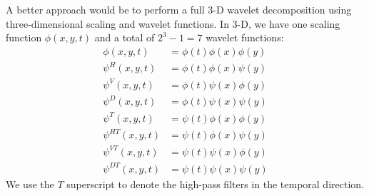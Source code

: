 A better approach would be to perform a full 3-D wavelet decomposition using three-dimensional scaling and wavelet functions.
In 3-D, we have one scaling function $\phi(x,y,t)$ and a total of $2^3-1=7$ wavelet functions:
\begin{equation*}
  \begin{split}
    \phi(x,y,t) &= \phi(t) \phi(x) \phi(y)\\
    \psi^H(x,y,t) &=\phi(t) \phi(x) \psi(y) \\
    \psi^V(x,y,t) &=\phi(t) \psi(x) \phi(y) \\
    \psi^D(x,y,t) &=\phi(t) \psi(x) \psi(y) \\
    \psi^T(x,y,t) &= \psi(t) \phi(x) \phi(y)\\
    \psi^{HT}(x,y,t) &=\psi(t) \phi(x) \psi(y) \\
    \psi^{VT}(x,y,t) &=\psi(t) \psi(x) \phi(y) \\
    \psi^{DT}(x,y,t) &=\psi(t) \psi(x) \psi(y)
  \end{split}
\end{equation*}
We use the $T$ superscript to denote the high-pass filters in the temporal direction.

